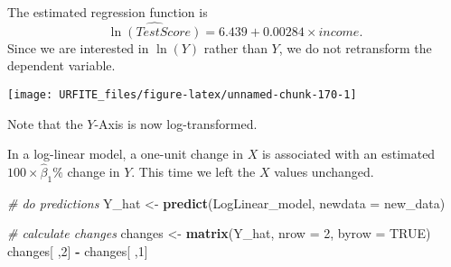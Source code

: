 \documentclass[]{book}
\newenvironment{Shaded}{\begin{snugshade}}{\end{snugshade}}
\newcommand{\KeywordTok}[1]{\textcolor[rgb]{0.13,0.29,0.53}{\textbf{#1}}}
\newcommand{\DataTypeTok}[1]{\textcolor[rgb]{0.13,0.29,0.53}{#1}}
\newcommand{\DecValTok}[1]{\textcolor[rgb]{0.00,0.00,0.81}{#1}}
\newcommand{\StringTok}[1]{\textcolor[rgb]{0.31,0.60,0.02}{#1}}
\newcommand{\CommentTok}[1]{\textcolor[rgb]{0.56,0.35,0.01}{\textit{#1}}}
\newcommand{\OtherTok}[1]{\textcolor[rgb]{0.56,0.35,0.01}{#1}}
\newcommand{\OperatorTok}[1]{\textcolor[rgb]{0.81,0.36,0.00}{\textbf{#1}}}
\newcommand{\NormalTok}[1]{#1}
\theoremstyle{definition}
\theoremstyle{definition}
\theoremstyle{definition}
\theoremstyle{remark}
\begin{document}
The estimated regression function is
\[\widehat{\ln(TestScore)} = 6.439 + 0.00284 \times income.\] Since we
are interested in \(\ln(Y)\) rather than \(Y\), we do not retransform
the dependent variable.

\begin{Shaded}
\end{Shaded}

\begin{center}\texttt{[image: URFITE\_files/figure-latex/unnamed-chunk-170-1]} \end{center}

Note that the \(Y\)-Axis is now log-transformed.

In a log-linear model, a one-unit change in \(X\) is associated with an
estimated \(100 \times \hat\beta_1 \%\) change in \(Y\). This time we
left the \(X\) values unchanged.

\begin{Shaded}
\begin{Highlighting}[]
\CommentTok{# do predictions}
\NormalTok{Y_hat <-}\StringTok{ }\KeywordTok{predict}\NormalTok{(LogLinear_model, }\DataTypeTok{newdata =}\NormalTok{ new_data)}

\CommentTok{# calculate changes}
\NormalTok{changes <-}\StringTok{ }\KeywordTok{matrix}\NormalTok{(Y_hat, }\DataTypeTok{nrow =} \DecValTok{2}\NormalTok{, }\DataTypeTok{byrow =} \OtherTok{TRUE}\NormalTok{)}
\NormalTok{changes[ ,}\DecValTok{2}\NormalTok{] }\OperatorTok{-}\StringTok{ }\NormalTok{changes[ ,}\DecValTok{1}\NormalTok{]}
\end{Highlighting}
\end{Shaded}
\end{document}
